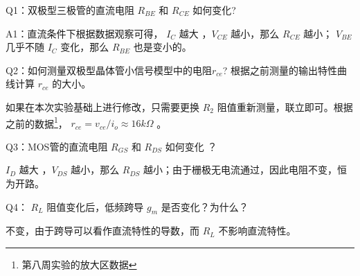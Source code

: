 \documentclass[lang=cn,11pt,a4paper,cite=authoryear]{elegantpaper}
\begin{document}
Q1：双极型三极管的直流电阻 \(R_{BE}\) 和 \(R_{CE}\) 如何变化?

A1：直流条件下根据数据观察可得， \(I_C\) 越大 ，\(V_{CE}\) 越小，那么 \(R_{CE}\) 越小； \(V_{BE}\) 几乎不随 \(I_C\) 变化，那么 \(R_{BE}\) 也是变小的。

Q2：如何测量双极型晶体管小信号模型中的电阻\(r_{ce}\)?
根据之前测量的输出特性曲线计算 \(r_{ce}\) 的大小。

如果在本次实验基础上进行修改，只需要更换 \(R_2\) 阻值重新测量，联立即可。根据之前的数据\footnote{第八周实验的放大区数据}， \(r_{ce} = v_{ce} / i_o \approx 16 k\Omega\) 。

Q3：MOS管的直流电阻 \(R_{GS}\) 和 \(R_{DS}\) 如何变化 ？

\(I_D\) 越大 ，\(V_{DS}\) 越小，那么 \(R_{DS}\) 越小；由于栅极无电流通过，因此电阻不变，恒为开路。

Q4： \(R_L\) 阻值变化后，低频跨导 \(g_m\) 是否变化？为什么？

不变，由于跨导可以看作直流特性的导数，而 \(R_L\) 不影响直流特性。


\end{document}
